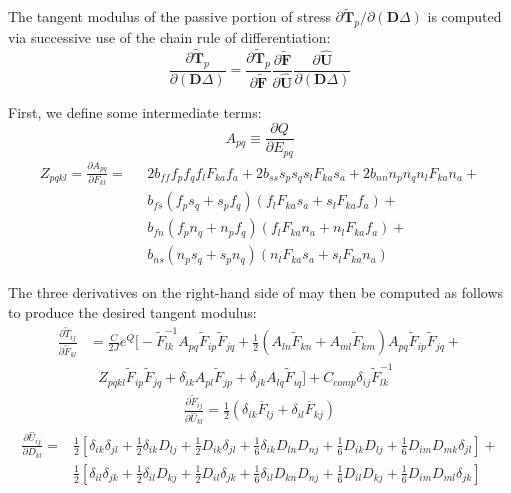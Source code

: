 The tangent modulus of the passive portion of stress ${\partial \tilde{\bm{T}}_p}/{\partial (\bm{D}\Delta)}$ is computed via successive use of the chain rule of differentiation:
\begin{equation}
\frac{\partial \tilde{\bm{T}}_p}{\partial (\bm{D}\Delta)} = \frac{\partial \tilde{\bm{T}}_p}{\partial \tilde{\bm{F}}}\frac{\partial \tilde{\bm{F}}}{\partial \hat{\bm{U}}}\frac{\partial \hat{\bm{U}}}{\partial (\bm{D}\Delta)}
\label{eqn:tanmod}
\end{equation}

First, we define some intermediate terms:
\begin{equation}
A_{pq} \equiv \frac{\partial Q}{\partial E_{pq}}
\end{equation}
\begin{equation}
\begin{aligned}
Z_{pqkl} = \frac{\partial A_{pq}}{\partial F_{kl}} = \text{\ } &2b_{ff}f_pf_qf_lF_{ka}f_a + 2b_{ss}s_ps_qs_lF_{ka}s_a + 2b_{nn}n_pn_qn_lF_{ka}n_a +\\
& b_{fs}\left(f_ps_q + s_pf_q\right)\left(f_lF_{ka}s_a + s_lF_{ka}f_a\right) +\\
& b_{fn}\left(f_pn_q + n_pf_q\right)\left(f_lF_{ka}n_a + n_lF_{ka}f_a\right) +\\
& b_{ns}\left(n_ps_q + s_pn_q\right)\left(n_lF_{ka}s_a + s_lF_{ka}n_a\right)
\end{aligned}
\end{equation}

The three derivatives on the right-hand side of  may then be computed as follows to produce the desired tangent modulus:
\begin{equation}
\begin{aligned}
\frac{\partial \tilde{T}_{ij}}{\partial \tilde{F}_{kl}} &= \frac{C}{2J}e^{Q} \Bigg[-\tilde{F}^{-1}_{lk}A_{pq}\tilde{F}_{ip}\tilde{F}_{jq} + \frac{1}{2}(A_{ln}\tilde{F}_{kn} + A_{ml}\tilde{F}_{km})A_{pq}\tilde{F}_{ip}\tilde{F}_{jq} + \\
&\text{\ \ \ }Z_{pqkl}\tilde{F}_{ip}\tilde{F}_{jq} + \delta_{ik}A_{pl}\tilde{F}_{jp} + \delta_{jk}A_{lq}\tilde{F}_{iq}\Bigg] + C_{comp}\delta_{ij}\tilde{F}^{-1}_{lk}
\end{aligned}
\end{equation}
\begin{align}
\frac{\partial \tilde{F}_{ij}}{\partial \hat{U}_{kl}} = \frac{1}{2}\left(\delta_{ik}\overline{F}_{lj} + \delta_{il}\overline{F}_{kj}\right)
\end{align}
\begin{equation}
\begin{aligned}
\frac{\partial \hat{U}_{ij}}{\partial D_{kl}} = &\frac{1}{2}\left[\delta_{ik}\delta_{jl} + \frac{1}{2}\delta_{ik}D_{lj} + \frac{1}{2}D_{ik}\delta_{jl} + \frac{1}{6}\delta_{ik}D_{ln}D_{nj} + \frac{1}{6}D_{ik}D_{lj} + \frac{1}{6}D_{im}D_{mk}\delta_{jl}\right] + \\
&\frac{1}{2}\left[\delta_{il}\delta_{jk} + \frac{1}{2}\delta_{il}D_{kj} + \frac{1}{2}D_{il}\delta_{jk} + \frac{1}{6}\delta_{il}D_{kn}D_{nj} + \frac{1}{6}D_{il}D_{kj} + \frac{1}{6}D_{im}D_{ml}\delta_{jk}\right]
\end{aligned}
\end{equation}

